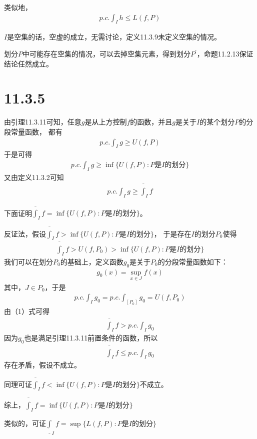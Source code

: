 \documentclass{article}
\begin{document}
类似地，
\begin{align*}
  p.c.\int_{I}h \leq L(f, P)
\end{align*}

\begin{zremark}
  $I$是空集的话，空虚的成立，无需讨论，定义11.3.9未定义空集的情况。

  划分$P$中可能存在空集的情况，可以去掉空集元素，得到划分$P^\prime$，命题11.2.13保证结论任然成立。
\end{zremark}

\section*{11.3.5}

由引理11.3.11可知，任意$g$是从上方控制$f$的函数，并且$g$是关于$I$的某个划分$P$的分段常量函数，
都有
\begin{align*}
  p.c.\int_{I}g \geq U(f, P)
\end{align*}
于是可得
\begin{align*}
  p.c.\int_{I}g \geq \inf\{U(f,P): P \text{是} I \text{的划分}\}
\end{align*}
又由定义11.3.2可知
\begin{align*}
  p.c.\int_{I}g \geq \overline{\int}_{I} f
\end{align*}

下面证明$\overline{\int}_{I} f  = \inf\{U(f,P): P \text{是} I \text{的划分}\}$。

反证法，假设$ \overline{\int}_{I} f  > \inf\{U(f,P): P \text{是} I \text{的划分}\}$，
于是存在$I$的划分$P_0$使得
\begin{align}
    \overline{\int}_{I} f  > U(f,P_0) > \inf\{U(f,P): P \text{是} I \text{的划分}\} 
\end{align}
我们可以在划分$P_0$的基础上，定义函数$g_0$是关于$P_0$的分段常量函数如下：
\begin{align*}
  g_0(x) = \sup\limits_{x \in J}f(x)
\end{align*}
其中，$J \in P_0$，于是
\begin{align*}
  p.c.\int_{I}g_0 = p.c.\int_{[P_0]}g_0 = U(f, P_0)
\end{align*}
由（1）式可得
\begin{align*}
  \overline{\int}_{I} f  > p.c.\int_{I}g_0
\end{align*}
因为$g_0$也是满足引理11.3.11前置条件的函数，所以
\begin{align*}
  \overline{\int}_{I} f \leq p.c.\int_{I}g_0
\end{align*}
存在矛盾，假设不成立。

同理可证$\overline{\int}_{I} f  < \inf\{U(f,P): P \text{是} I \text{的划分}\}$不成立。

综上，$\overline{\int}_{I} f  = \inf\{U(f,P): P \text{是} I \text{的划分}\}$

类似的，可证$\underline{\int}_I  f = \sup\{L(f,P): P \text{是} I \text{的划分}\}$
\end{document}
